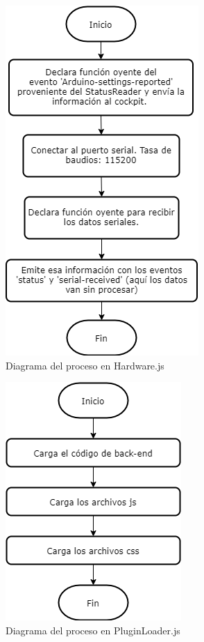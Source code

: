\begin{figure}[H]
    \centering
    \includegraphics[scale=0.63]{partes/ImgSophia/ApendiceC/DiagramaHardware.png}
    \caption{Diagrama del proceso en Hardware.js}
    \label{fig:DiagHardware}
\end{figure}

\begin{figure}[H]
    \centering
    \includegraphics[scale=0.63]{partes/ImgSophia/ApendiceC/DiagramaPluginLoad.png}
    \caption{Diagrama del proceso en PluginLoader.js}
    \label{fig:DiagPluginLoader}
\end{figure}




